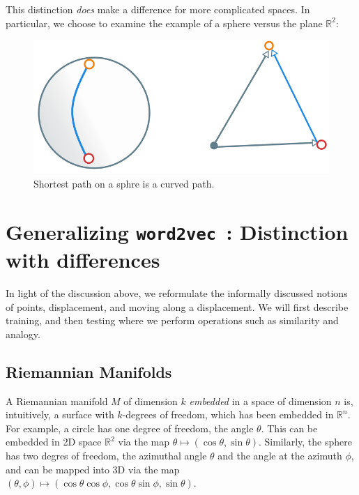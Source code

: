 \documentclass[11pt]{book}
\newcommand{\wtov}{\texttt{word2vec }}
\newcommand{\R}{\ensuremath{\mathbb R}}
\begin{document}

This distinction \emph{does} make a difference for more complicated spaces.
In particular, we choose to examine the example of a sphere versus the plane
$\mathbb R^2$:

\begin{figure}[htb]
\includegraphics[width=\textwidth]{figures/sphere-shortest-path.png}
\caption{Shortest path on a sphre is a curved path.}
\end{figure}

\section{Generalizing \wtov: Distinction with differences}

In light of the discussion above, we reformulate the informally discussed notions of
points, displacement, and moving along a displacement. We will first describe training, and then
testing where we perform operations such as similarity and analogy.

\subsection{Riemannian Manifolds}
A Riemannian manifold $M$ of dimension $k$ \emph{embedded} in a space of
dimension $n$ is, intuitively, a surface with $k$-degrees of freedom, which has
been embedded in $\R^n$.  For example, a circle has one degree of freedom, the angle $\theta$.
This can be embedded in 2D space $\mathbb R^2$ via the map $\theta \mapsto (\cos \theta, \sin \theta)$.
Similarly, the sphere has two degres of freedom, the azimuthal angle $\theta$ and the angle
at the azimuth $\phi$, and can be mapped into 3D via the map
$(\theta, \phi) \mapsto (\cos \theta \cos \phi, \cos \theta \sin \phi, \sin \theta)$.
\end{document}
